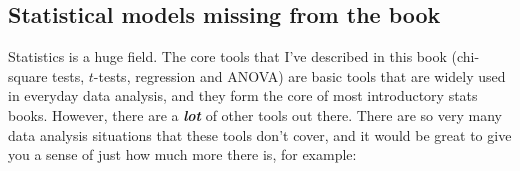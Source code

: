 \documentclass[
]{book}
\begin{document}
\hypertarget{statistical-models-missing-from-the-book}{%
\subsection{Statistical models missing from the book}\label{statistical-models-missing-from-the-book}}

Statistics is a huge field. The core tools that I've described in this book (chi-square tests, \(t\)-tests, regression and ANOVA) are basic tools that are widely used in everyday data analysis, and they form the core of most introductory stats books. However, there are a \textbf{\emph{lot}} of other tools out there. There are so very many data analysis situations that these tools don't cover, and it would be great to give you a sense of just how much more there is, for example:
\end{document}
